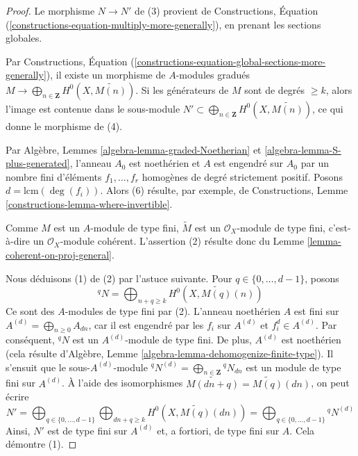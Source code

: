 \begin{proof}
Le morphisme $N \to N'$ de (3) provient de Constructions, Équation
(\ref{constructions-equation-multiply-more-generally}), en prenant les sections
globales.

\medskip\noindent
Par Constructions, Équation
(\ref{constructions-equation-global-sections-more-generally}), il existe un
morphisme de $A$-modules gradués
$M \to \bigoplus_{n \in \mathbf{Z}} H^0(X, \widetilde{M(n)})$.
Si les générateurs de $M$ sont de degrés $\geq k$, alors l'image est contenue
dans le sous-module
$N' \subset \bigoplus_{n \in \mathbf{Z}} H^0(X, \widetilde{M(n)})$, ce qui
donne le morphisme de (4).

\medskip\noindent
Par Algèbre, Lemmes \ref{algebra-lemma-graded-Noetherian} et
\ref{algebra-lemma-S-plus-generated}, l'anneau $A_0$ est noethérien et $A$ est
engendré sur $A_0$ par un nombre fini d'éléments
$f_1, \ldots, f_r$ homogènes de degré strictement positif. Posons
$d = \text{lcm}(\deg(f_i))$. Alors (6) résulte, par exemple, de Constructions,
Lemme \ref{constructions-lemma-where-invertible}.

\medskip\noindent
Comme $M$ est un $A$-module de type fini, $\widetilde{M}$ est un
$\mathcal{O}_X$-module de type fini, c'est-à-dire un
$\mathcal{O}_X$-module cohérent. L'assertion (2) résulte donc du Lemme
\ref{lemma-coherent-on-proj-general}.

\medskip\noindent
Nous déduisons (1) de (2) par l'astuce suivante. Pour
$q \in \{0, \ldots, d - 1\}$, posons
$$
{}^qN = \bigoplus\nolimits_{n + q \geq k} H^0(X, \widetilde{M(q)}(n))
$$
Ce sont des $A$-modules de type fini par (2). L'anneau noethérien $A$ est fini sur
$A^{(d)} = \bigoplus_{n \geq 0} A_{dn}$, car il est engendré par les $f_i$ sur
$A^{(d)}$ et $f_i^d \in A^{(d)}$. Par conséquent, ${}^qN$ est un
$A^{(d)}$-module de type fini. De plus, $A^{(d)}$ est noethérien (cela résulte
d'Algèbre, Lemme \ref{algebra-lemma-dehomogenize-finite-type}). Il s'ensuit que
le sous-$A^{(d)}$-module
${}^qN^{(d)} = \bigoplus_{n \in \mathbf{Z}} {}^qN_{dn}$
est un module de type fini sur $A^{(d)}$. À l'aide des isomorphismes
$\widetilde{M(dn + q)} = \widetilde{M(q)}(dn)$, on peut écrire
$$
N' =
\bigoplus\nolimits_{q \in \{0, \ldots, d - 1\}}
\bigoplus\nolimits_{dn + q \geq k}
H^0(X, \widetilde{M(q)}(dn)) =
\bigoplus\nolimits_{q \in \{0, \ldots, d - 1\}} {}^qN^{(d)}
$$
Ainsi, $N'$ est de type fini sur $A^{(d)}$ et, a fortiori, de type fini sur $A$. Cela démontre
(1).


\end{proof}
